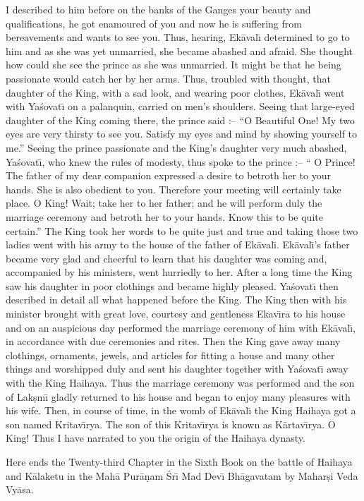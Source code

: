 I described to him before on the banks of the Ganges your beauty and qualifications, he got enamoured of you and now he is suffering from bereavements and wants to see you. Thus, hearing, Ek\=aval\={\i} determined to go to him and as she was yet unmarried, she became abashed and afraid. She thought how could she see the prince as she was unmarried. It might be that he being passionate would catch her by her arms. Thus, troubled with thought, that daughter of the King, with a sad look, and wearing poor clothes, Ek\=aval\={\i} went with Ya\'sovat\={\i} on a palanquin, carried on men's shoulders. Seeing that large-eyed daughter of the King coming there, the prince said :-- ``O Beautiful One! My two eyes are very thirsty to see you. Satisfy my eyes and mind by showing yourself to me.'' Seeing the prince passionate and the King's daughter very much abashed, Ya\'sovat\={\i}, who knew the rules of modesty, thus spoke to the prince :-- `` O Prince! The father of my dear companion expressed a desire to betroth her to your hands. She is also obedient to you. Therefore your meeting will certainly take place. O King! Wait; take her to her father; and he will perform duly the marriage ceremony and betroth her to your hands. Know this to be quite certain.'' The King took her words to be quite just and true and taking those two ladies went with his army to the house of the father of Ek\=aval\={\i}. Ek\=aval\={\i}'s father became very glad and cheerful to learn that his daughter was coming and, accompanied by his ministers, went hurriedly to her. After a long time the King saw his daughter in poor clothings and became highly pleased. Ya\'sovat\={\i} then described in detail all what happened before the King. The King then with his minister brought with great love, courtesy and gentleness Ekav\={\i}ra to his house and on an auspicious day performed the marriage ceremony of him with Ek\=aval\={\i}, in accordance with due ceremonies and rites. Then the King gave away many clothings, ornaments, jewels, and articles for fitting a house and many other things and worshipped duly and sent his daughter together with Ya\'sovat\={\i} away with the King Haihaya. Thus the marriage ceremony was performed and the son of Lak\d{s}m\={\i} gladly returned to his house and began to enjoy many pleasures with his wife. Then, in course of time, in the womb of Ek\=aval\={\i} the King Haihaya got a son named Kritav\={\i}rya. The son of this Kritav\={\i}rya is known as K\=artav\={\i}rya. O King! Thus I have narrated to you the origin of the Haihaya dynasty.

Here ends the Twenty-third Chapter in the Sixth Book on the battle of Haihaya and K\=alaketu in the Mah\=a Pur\=a\d{n}am \'Sr\={\i} Mad Dev\={\i} Bh\=agavatam by Mahar\d{s}i Veda Vy\=asa.




